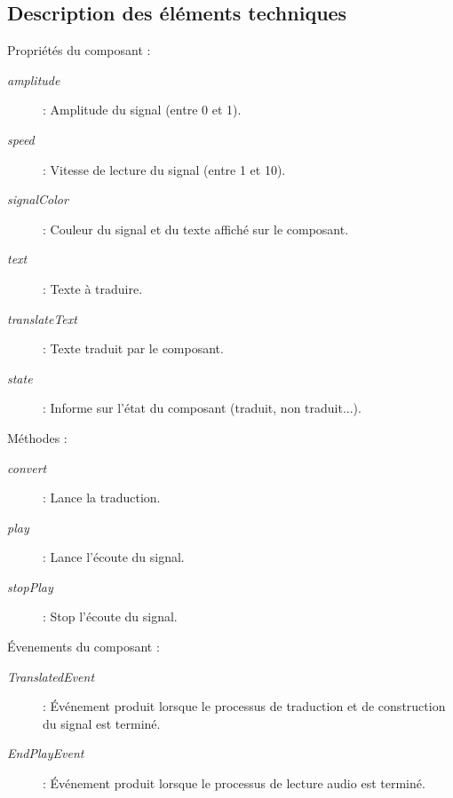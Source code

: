 \documentclass[a4paper,11pt]{article}
\begin{document}
    \subsection{Description des éléments techniques}
    \noindent
    Propriétés du composant :
    \begin{description}
        \item[\textit{amplitude}] : Amplitude du signal (entre 0 et 1).
        \item [\textit{speed}] : Vitesse de lecture du signal (entre 1 et 10).
        \item[\textit{signalColor}] : Couleur du signal et du texte affiché sur le composant.
        \item[\textit{text}] : Texte à traduire.
        \item[\textit{translateText}] : Texte traduit par le composant.
        \item[\textit{state}] : Informe sur l'état du composant (traduit, non traduit...).\\
    \end{description}
    Méthodes :
    \begin{description}
        \item[\textit{convert}] : Lance la traduction.
        \item[\textit{play}] : Lance l'écoute du signal.
        \item[\textit{stopPlay}] : Stop l'écoute du signal.\\
    \end{description}
    Évenements du composant :
    \begin{description}
        \item[\textit{TranslatedEvent}] : Événement produit lorsque le processus de traduction et de construction du signal est terminé.
        \item[\textit{EndPlayEvent}] : Événement produit lorsque le processus de lecture audio est terminé.
    \end{description}
\end{document}
